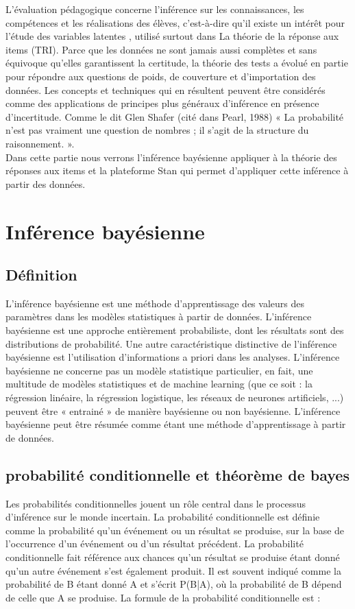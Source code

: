 L'évaluation pédagogique concerne l'inférence sur les connaissances, les compétences et les réalisations des élèves, c’est-à-dire qu’il existe un intérêt pour l'étude des variables latentes \cite{azevedo2011bayesian}, utilisé surtout dans La théorie de la réponse aux items (TRI). Parce que les données ne sont jamais aussi complètes et sans équivoque qu'elles garantissent la certitude, la théorie des tests a évolué en partie pour répondre aux questions de poids, de couverture et d'importation des données. Les concepts et techniques qui en résultent peuvent être considérés comme des applications de principes plus généraux d'inférence en présence d’incertitude. Comme le dit Glen Shafer (cité dans Pearl, 1988) « La probabilité n'est pas vraiment une question de nombres ; il s'agit de la structure du raisonnement. ». \\
Dans cette partie nous verrons l’inférence bayésienne appliquer à la théorie des réponses aux items et la plateforme Stan qui permet d’appliquer cette inférence à partir des données.\\

\section{Inférence bayésienne}
\subsection{Définition}
L'inférence bayésienne est une méthode d'apprentissage des valeurs des paramètres dans les modèles statistiques à partir de données. L'inférence bayésienne est une approche entièrement probabiliste, dont les résultats sont des distributions de probabilité. Une autre caractéristique distinctive de l'inférence bayésienne est l'utilisation d'informations a priori dans les analyses. L'inférence bayésienne ne concerne pas un modèle statistique particulier, en fait, une multitude de modèles statistiques et de machine learning (que ce soit : la régression linéaire, la régression logistique, les réseaux de neurones artificiels, ...) peuvent être « entrainé » de manière bayésienne ou non bayésienne. L'inférence bayésienne peut être résumée comme étant une méthode d'apprentissage à partir de données.

\subsection{probabilité conditionnelle et théorème de bayes}
Les probabilités conditionnelles jouent un rôle central dans le processus d'inférence sur le monde incertain. La probabilité conditionnelle est définie comme la probabilité qu'un événement ou un résultat se produise, sur la base de l'occurrence d'un événement ou d'un résultat précédent. La probabilité conditionnelle fait référence aux chances qu'un résultat se produise étant donné qu'un autre événement s'est également produit. Il est souvent indiqué comme la probabilité de B étant donné A et s'écrit P(B|A), où la probabilité de B dépend de celle que A se produise. La formule de la probabilité conditionnelle est :

